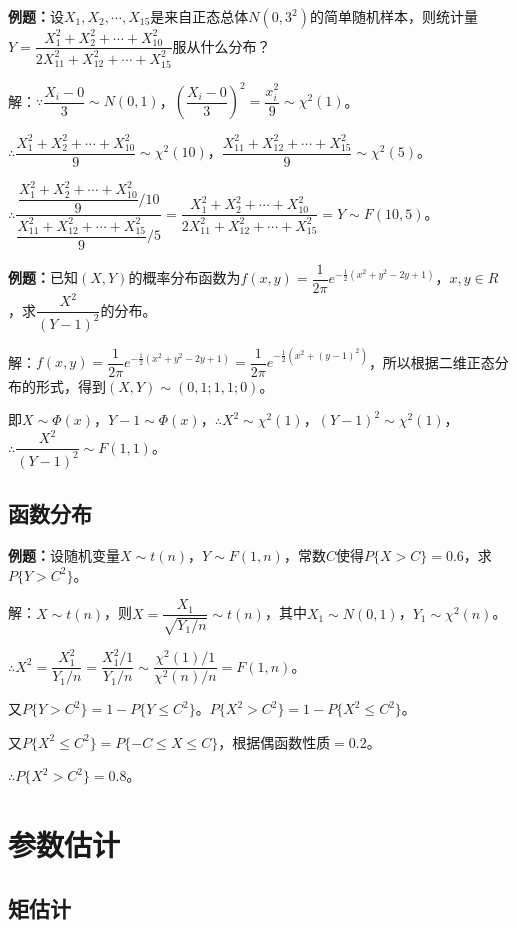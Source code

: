 \documentclass[UTF8, 12pt]{ctexart}
\begin{document}
\textbf{例题：}设$X_1,X_2,\cdots,X_15$是来自正态总体$N(0,3^2)$的简单随机样本，则统计量$Y=\dfrac{X_1^2+X_2^2+\cdots+X_{10}^2}{2X_{11}^2+X_{12}^2+\cdots+X_{15}^2}$服从什么分布？

解：$\because\dfrac{X_i-0}{3}\sim N(0,1)$，$\left(\dfrac{X_i-0}{3}\right)^2=\dfrac{x_i^2}{9}\sim\chi^2(1)$。

$\therefore\dfrac{X_1^2+X_2^2+\cdots+X_{10}^2}{9}\sim\chi^2(10)$，$\dfrac{X_{11}^2+X_{12}^2+\cdots+X_{15}^2}{9}\sim\chi^2(5)$。

$\therefore\dfrac{\dfrac{X_1^2+X_2^2+\cdots+X_{10}^2}{9}/10}{\dfrac{X_{11}^2+X_{12}^2+\cdots+X_{15}^2}{9}/5}=\dfrac{X_1^2+X_2^2+\cdots+X_{10}^2}{2X_{11}^2+X_{12}^2+\cdots+X_{15}^2}=Y\sim F(10,5)$。

\textbf{例题：}已知$(X,Y)$的概率分布函数为$f(x,y)=\dfrac{1}{2\pi}e^{-\frac{1}{2}(x^2+y^2-2y+1)}$，$x,y\in R$，求$\dfrac{X^2}{(Y-1)^2}$的分布。

解：$f(x,y)=\dfrac{1}{2\pi}e^{-\frac{1}{2}(x^2+y^2-2y+1)}=\dfrac{1}{2\pi}e^{-\frac{1}{2}(x^2+(y-1)^2)}$，所以根据二维正态分布的形式，得到$(X,Y)\sim(0,1;1,1;0)$。

即$X\sim\varPhi(x)$，$Y-1\sim\varPhi(x)$，$\therefore X^2\sim\chi^2(1)$，$(Y-1)^2\sim\chi^2(1)$，$\therefore\dfrac{X^2}{(Y-1)^2}\sim F(1,1)$。

\subsection{函数分布}

\textbf{例题：}设随机变量$X\sim t(n)$，$Y\sim F(1,n)$，常数$C$使得$P\{X>C\}=0.6$，求$P\{Y>C^2\}$。

解：$X\sim t(n)$，则$X=\dfrac{X_1}{\sqrt{Y_1/n}}\sim t(n)$，其中$X_1\sim N(0,1)$，$Y_1\sim\chi^2(n)$。

$\therefore X^2=\dfrac{X_1^2}{Y_1/n}=\dfrac{X_1^2/1}{Y_1/n}\sim\dfrac{\chi^2(1)/1}{\chi^2(n)/n}=F(1,n)$。

又$P\{Y>C^2\}=1-P\{Y\leqslant C^2\}$。$P\{X^2>C^2\}=1-P\{X^2\leqslant C^2\}$。

又$P\{X^2\leqslant C^2\}=P\{-C\leqslant X\leqslant C\}$，根据偶函数性质$=0.2$。

$\therefore P\{X^2>C^2\}=0.8$。

\section{参数估计}

\subsection{矩估计}
\end{document}
